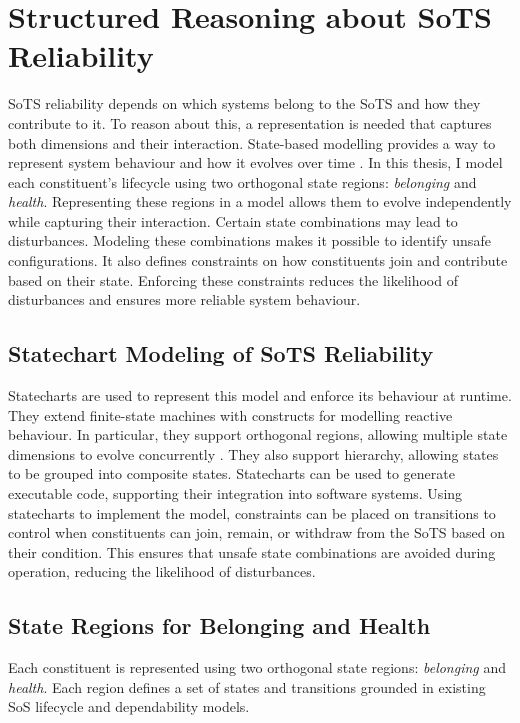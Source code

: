 \section{Structured Reasoning about SoTS Reliability}\label{sec:structured-reasoning}
SoTS reliability depends on which systems belong to the SoTS and how they contribute to it. To reason about this, a representation is needed that captures both dimensions and their interaction. State-based modelling provides a way to represent system behaviour and how it evolves over time \cite{liang2006comparative}. In this thesis, I model each constituent's lifecycle using two orthogonal state regions: \emph{belonging} and \emph{health}. Representing these regions in a model allows them to evolve independently while capturing their interaction. Certain state combinations may lead to disturbances. Modeling these combinations makes it possible to identify unsafe configurations. It also defines constraints on how constituents join and contribute based on their state. Enforcing these constraints reduces the likelihood of disturbances and ensures more reliable system behaviour.

\subsection{Statechart Modeling of SoTS Reliability}
\label{sec:statecharts-reliability}
Statecharts \cite{harel1987statecharts} are used to represent this model and enforce its behaviour at runtime. They extend finite-state machines with constructs for modelling reactive behaviour. In particular, they support orthogonal regions, allowing multiple state dimensions to evolve concurrently \cite{harel1998modeling}. They also support hierarchy, allowing states to be grouped into composite states. Statecharts can be used to generate executable code, supporting their integration into software systems. Using statecharts to implement the model, constraints can be placed on transitions to control when constituents can join, remain, or withdraw from the SoTS based on their condition. This ensures that unsafe state combinations are avoided during operation, reducing the likelihood of disturbances.



\subsection{State Regions for Belonging and Health}
\label{sec:constituent-state-space}
Each constituent is represented using two orthogonal state regions: \emph{belonging} and \emph{health}. Each region defines a set of states and transitions grounded in existing SoS lifecycle and dependability models.

